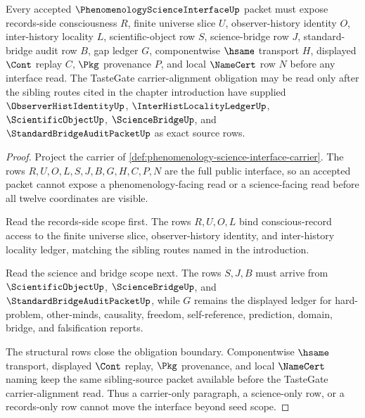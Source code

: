 \begin{theorem}
\label{thm:phenomenology-science-interface-tastegate-obligation-scope}
Every accepted $\PhenomenologyScienceInterfaceUp$ packet must expose records-side consciousness $R$, finite universe slice $U$, observer-history identity $O$, inter-history locality $L$, scientific-object row $S$, science-bridge row $J$, standard-bridge audit row $B$, gap ledger $G$, componentwise $\hsame$ transport $H$, displayed $\Cont$ replay $C$, $\Pkg$ provenance $P$, and local $\NameCert$ row $N$ before any interface read. The TasteGate carrier-alignment obligation may be read only after the sibling routes cited in the chapter introduction have supplied $\ObserverHistIdentityUp$, $\InterHistLocalityLedgerUp$, $\ScientificObjectUp$, $\ScienceBridgeUp$, and $\StandardBridgeAuditPacketUp$ as exact source rows.
\end{theorem}
\begin{proof}
Project the carrier of \autoref{def:phenomenology-science-interface-carrier}. The rows $R,U,O,L,S,J,B,G,H,C,P,N$ are the full public interface, so an accepted packet cannot expose a phenomenology-facing read or a science-facing read before all twelve coordinates are visible.

Read the records-side scope first. The rows $R,U,O,L$ bind conscious-record access to the finite universe slice, observer-history identity, and inter-history locality ledger, matching the sibling routes named in the introduction.

Read the science and bridge scope next. The rows $S,J,B$ must arrive from $\ScientificObjectUp$, $\ScienceBridgeUp$, and $\StandardBridgeAuditPacketUp$, while $G$ remains the displayed ledger for hard-problem, other-minds, causality, freedom, self-reference, prediction, domain, bridge, and falsification reports.

The structural rows close the obligation boundary. Componentwise $\hsame$ transport, displayed $\Cont$ replay, $\Pkg$ provenance, and local $\NameCert$ naming keep the same sibling-source packet available before the TasteGate carrier-alignment read. Thus a carrier-only paragraph, a science-only row, or a records-only row cannot move the interface beyond seed scope.
\end{proof}



